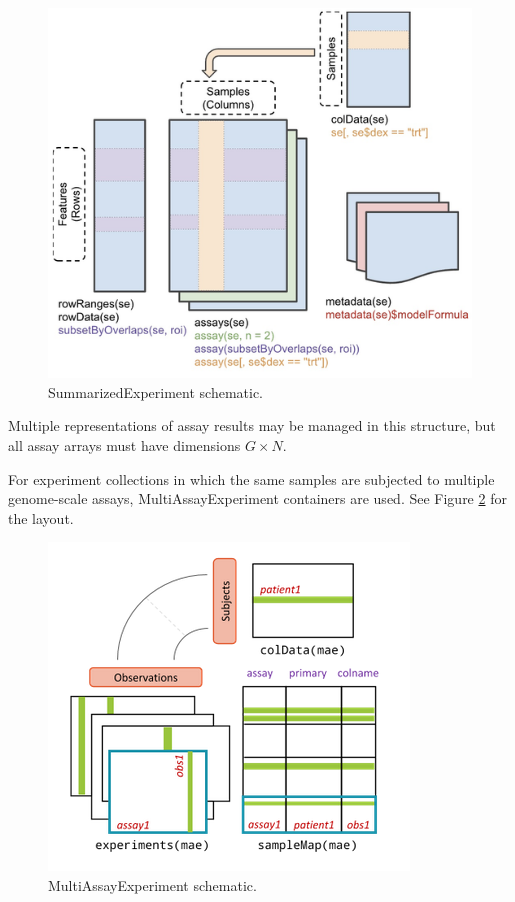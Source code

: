 \documentclass[graybox]{svmult}
\begin{document}
\begin{figure}
\includegraphics[width=0.8\linewidth,]{SEschema} \caption{SummarizedExperiment schematic.}\label{fig:sesc}
\end{figure}

Multiple representations of assay results may be managed in this
structure, but all assay arrays must have dimensions \(G \times N\).

For experiment collections in which the same samples are subjected
to multiple genome-scale assays, MultiAssayExperiment containers are used. See Figure \ref{fig:masc} for the layout.

\begin{figure}
\includegraphics[width=0.8\linewidth,]{MAEschema} \caption{MultiAssayExperiment schematic.}\label{fig:masc}
\end{figure}
\end{document}
